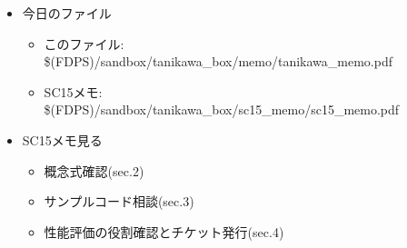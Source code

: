 \begin{itemize}
\item 今日のファイル
  \begin{itemize}
  \item このファイル: \$(FDPS)/sandbox/tanikawa\_box/memo/tanikawa\_memo.pdf
  \item SC15メモ: \$(FDPS)/sandbox/tanikawa\_box/sc15\_memo/sc15\_memo.pdf
  \end{itemize}
\item SC15メモ見る
  \begin{itemize}
  \item 概念式確認(sec.2)
  \item サンプルコード相談(sec.3)
  \item 性能評価の役割確認とチケット発行(sec.4)
  \end{itemize}
\end{itemize}
